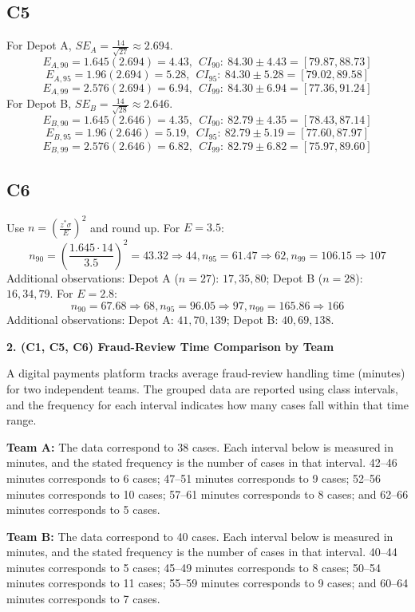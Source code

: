 \begin{ExamProblems}
		\subsection*{C5}
		For Depot A, $SE_A=\frac{14}{\sqrt{27}}\approx2.694$.
		\[
		E_{A,90}=1.645(2.694)=4.43,\ \ CI_{90}:\ 84.30\pm4.43=[79.87,88.73]
		\]
		\[
		E_{A,95}=1.96(2.694)=5.28,\ \ CI_{95}:\ 84.30\pm5.28=[79.02,89.58]
		\]
		\[
		E_{A,99}=2.576(2.694)=6.94,\ \ CI_{99}:\ 84.30\pm6.94=[77.36,91.24]
		\]
		For Depot B, $SE_B=\frac{14}{\sqrt{28}}\approx2.646$.
		\[
		E_{B,90}=1.645(2.646)=4.35,\ \ CI_{90}:\ 82.79\pm4.35=[78.43,87.14]
		\]
		\[
		E_{B,95}=1.96(2.646)=5.19,\ \ CI_{95}:\ 82.79\pm5.19=[77.60,87.97]
		\]
		\[
		E_{B,99}=2.576(2.646)=6.82,\ \ CI_{99}:\ 82.79\pm6.82=[75.97,89.60]
		\]
		
		\subsection*{C6}
		Use $n=\left(\frac{z^*\sigma}{E}\right)^2$ and round up.
		For $E=3.5$:
		\[
		n_{90}=\left(\frac{1.645\cdot14}{3.5}\right)^2=43.32\Rightarrow44,
		n_{95}=61.47\Rightarrow62,
		n_{99}=106.15\Rightarrow107
		\]
		Additional observations:
		Depot A ($n=27$): $17,35,80$; Depot B ($n=28$): $16,34,79$.
		For $E=2.8$:
		\[
		n_{90}=67.68\Rightarrow68,
		n_{95}=96.05\Rightarrow97,
		n_{99}=165.86\Rightarrow166
		\]
		Additional observations:
		Depot A: $41,70,139$; Depot B: $40,69,138$.
		
		\newpage
		\item
		\textbf{2. (C1, C5, C6) Fraud-Review Time Comparison by Team}
		
		A digital payments platform tracks average fraud-review handling time (minutes) for two independent teams.
		The grouped data are reported using class intervals, and the frequency for each interval indicates how many cases fall within that time range.
		
		\textbf{Team A:} The data correspond to 38 cases. Each interval below is measured in minutes, and the stated frequency is the number of cases in that interval. 42--46 minutes corresponds to 6 cases; 47--51 minutes corresponds to 9 cases; 52--56 minutes corresponds to 10 cases; 57--61 minutes corresponds to 8 cases; and 62--66 minutes corresponds to 5 cases.
		
		\textbf{Team B:} The data correspond to 40 cases. Each interval below is measured in minutes, and the stated frequency is the number of cases in that interval. 40--44 minutes corresponds to 5 cases; 45--49 minutes corresponds to 8 cases; 50--54 minutes corresponds to 11 cases; 55--59 minutes corresponds to 9 cases; and 60--64 minutes corresponds to 7 cases.
		

\end{ExamProblems}
